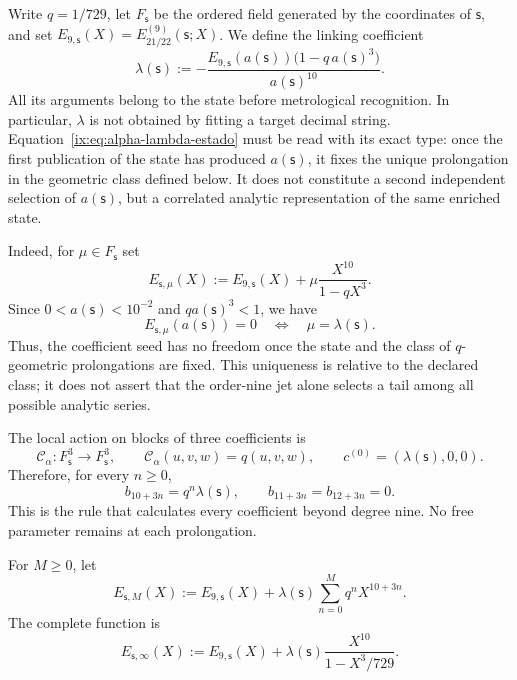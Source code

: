 Write \(q=1/729\), let \(F_{\mathsf s}\) be the ordered field generated by
the coordinates of \(\mathsf s\), and set
\(E_{9,\mathsf s}(X)=E_{21/22}^{(9)}(\mathsf s;X)\). We define the linking
coefficient
\begin{equation}
 \lambda(\mathsf s):=
 -\frac{E_{9,\mathsf s}(a(\mathsf s))
         \bigl(1-q\,a(\mathsf s)^3\bigr)}{a(\mathsf s)^{10}}.
 \label{ix:eq:alpha-lambda-estado}
\end{equation}
All its arguments belong to the state before metrological
recognition. In particular, \(\lambda\) is not obtained by fitting a target decimal
string. Equation~\eqref{ix:eq:alpha-lambda-estado} must be read with
its exact type: once the first publication of the state has produced
\(a(\mathsf s)\), it fixes the unique prolongation in the geometric class defined
below. It does not constitute a second independent selection of
\(a(\mathsf s)\), but a correlated analytic representation of the same
enriched state.

Indeed, for \(\mu\in F_{\mathsf s}\) set
\[
 E_{\mathsf s,\mu}(X)
 :=E_{9,\mathsf s}(X)+\mu\frac{X^{10}}{1-qX^3}.
\]
Since \(0<a(\mathsf s)<10^{-2}\) and \(qa(\mathsf s)^3<1\), we have
\begin{equation}
 E_{\mathsf s,\mu}(a(\mathsf s))=0
 \quad\Longleftrightarrow\quad
 \mu=\lambda(\mathsf s).
 \label{ix:eq:alpha-unicidad-lambda-clase-geometrica}
\end{equation}
Thus, the coefficient seed has no freedom once the state
and the class of \(q\)-geometric prolongations are fixed. This uniqueness is relative to the
declared class; it does not assert that the order-nine jet alone selects a
tail among all possible analytic series.

The local action on blocks of three coefficients is
\begin{equation}
 \mathcal C_\alpha:F_{\mathsf s}^{3}\longrightarrow F_{\mathsf s}^{3},
 \qquad \mathcal C_\alpha(u,v,w)=q(u,v,w),
 \qquad c^{(0)}=(\lambda(\mathsf s),0,0).
 \label{ix:eq:alpha-accion-coeficientes}
\end{equation}
Therefore, for every \(n\geq0\),
\begin{equation}
 b_{10+3n}=q^n\lambda(\mathsf s),\qquad
 b_{11+3n}=b_{12+3n}=0.
 \label{ix:eq:alpha-recurrencia-coeficientes}
\end{equation}
This is the rule that calculates every coefficient beyond degree nine. No
free parameter remains at each prolongation.

For \(M\geq0\), let
\begin{equation}
 E_{\mathsf s,M}(X):=E_{9,\mathsf s}(X)
 +\lambda(\mathsf s)\sum_{n=0}^{M}q^nX^{10+3n}.
 \label{ix:eq:alpha-truncamientos-completos}
\end{equation}
The complete function is
\begin{equation}
 E_{\mathsf s,\infty}(X)
 :=E_{9,\mathsf s}(X)
 +\lambda(\mathsf s)\frac{X^{10}}{1-X^3/729}.
 \label{ix:eq:alpha-funcion-completa-explicita}
\end{equation}

